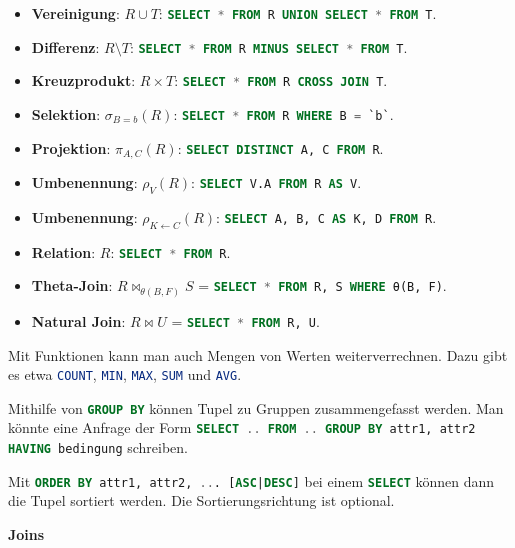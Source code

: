 \documentclass[a4paper,parskip=half*,DIV=15,fontsize=11pt]{scrartcl}
\newcommand{\sql}[1]{\lstinline[language=sql, mathescape=true]{#1}}
\begin{document}
\begin{itemize}
  \item \textbf{Vereinigung}: $R \cup T$: \sql{SELECT * FROM R UNION SELECT * FROM T}.
  \item \textbf{Differenz}: $R \setminus T$: \sql{SELECT * FROM R MINUS SELECT * FROM T}.
  \item \textbf{Kreuzprodukt}: $R \times T$: \sql{SELECT * FROM R CROSS JOIN T}.
  \item \textbf{Selektion}: $\sigma_{B=b}(R)$: \sql{SELECT * FROM R WHERE B = `b`}.
  \item \textbf{Projektion}: $\pi_{A,C}(R)$: \sql{SELECT DISTINCT A, C FROM R}.
  \item \textbf{Umbenennung}: $\rho_V(R)$: \sql{SELECT V.A FROM R AS V}.
  \item \textbf{Umbenennung}: $\rho_{K \leftarrow C}(R)$: \sql{SELECT A, B, C AS K, D FROM R}.
  \item \textbf{Relation}: $R$: \sql{SELECT * FROM R}.
  \item \textbf{Theta-Join}: $R \bowtie_{\theta(B, F)} S$ = \sql{SELECT * FROM R, S WHERE θ(B, F)}.
  \item \textbf{Natural Join}: $R \bowtie U$ = \sql{SELECT * FROM R, U}.
\end{itemize}

Mit Funktionen kann man auch Mengen von Werten weiterverrechnen. Dazu gibt es etwa \sql{COUNT}, \sql{MIN}, \sql{MAX}, \sql{SUM} und \sql{AVG}.

Mithilfe von \sql{GROUP BY} können Tupel zu Gruppen zusammengefasst werden. Man könnte eine Anfrage der Form \sql{SELECT .. FROM .. GROUP BY attr1, attr2 HAVING bedingung} schreiben.

Mit \sql{ORDER BY attr1, attr2, ... [ASC|DESC]} bei einem \sql{SELECT} können dann die Tupel sortiert werden. Die Sortierungsrichtung ist optional.

\textbf{Joins}
\end{document}
